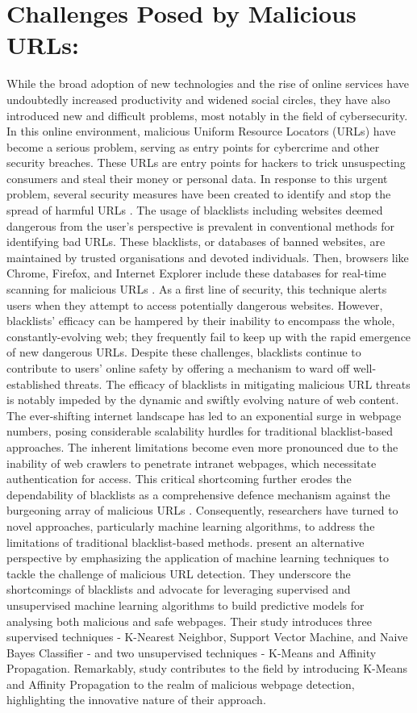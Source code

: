 \section{Challenges Posed by Malicious URLs:}
While the broad adoption of new technologies and the rise of online services have undoubtedly increased productivity and widened social circles, they have also introduced new and difficult problems, most notably in the field of cybersecurity. In this online environment, malicious Uniform Resource Locators (URLs) have become a serious problem, serving as entry points for cybercrime and other security breaches. These URLs are entry points for hackers to trick unsuspecting consumers and steal their money or personal data. In response to this urgent problem, several security measures have been created to identify and stop the spread of harmful URLs \cite{sahoo2017malicious}.
The usage of blacklists including websites deemed dangerous from the user's perspective is prevalent in conventional methods for identifying bad URLs. These blacklists, or databases of banned websites, are maintained by trusted organisations and devoted individuals. Then, browsers like Chrome, Firefox, and Internet Explorer include these databases for real-time scanning for malicious URLs \cite{tran2014towards}. As a first line of security, this technique alerts users when they attempt to access potentially dangerous websites. However, blacklists' efficacy can be hampered by their inability to encompass the whole, constantly-evolving web; they frequently fail to keep up with the rapid emergence of new dangerous URLs. Despite these challenges, blacklists continue to contribute to users' online safety by offering a mechanism to ward off well-established threats.
The efficacy of blacklists in mitigating malicious URL threats is notably impeded by the dynamic and swiftly evolving nature of web content. The ever-shifting internet landscape has led to an exponential surge in webpage numbers, posing considerable scalability hurdles for traditional blacklist-based approaches. The inherent limitations become even more pronounced due to the inability of web crawlers to penetrate intranet webpages, which necessitate authentication for access. This critical shortcoming further erodes the dependability of blacklists as a comprehensive defence mechanism against the burgeoning array of malicious URLs \cite{alkhudair2020detecting}. Consequently, researchers have turned to novel approaches, particularly machine learning algorithms, to address the limitations of traditional blacklist-based methods.
\cite{kazemian2015comparisons} present an alternative perspective by emphasizing the application of machine learning techniques to tackle the challenge of malicious URL detection. They underscore the shortcomings of blacklists and advocate for leveraging supervised and unsupervised machine learning algorithms to build predictive models for analysing both malicious and safe webpages. Their study introduces three supervised techniques - K-Nearest Neighbor, Support Vector Machine, and Naive Bayes Classifier - and two unsupervised techniques - K-Means and Affinity Propagation. Remarkably, \cite{kazemian2015comparisons} study contributes to the field by introducing K-Means and Affinity Propagation to the realm of malicious webpage detection, highlighting the innovative nature of their approach.
